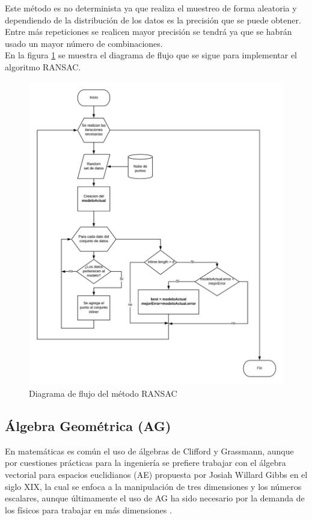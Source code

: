 Este método es no determinista ya que realiza el muestreo de forma aleatoria y dependiendo de la distribución de los datos es la precisión que se puede obtener. Entre más repeticiones se realicen mayor precisión se tendrá ya que se habrán usado un mayor número de combinaciones.\\

En la figura \ref{fig:RANSAC} se muestra el diagrama de flujo que se sigue para implementar el \gls{algoritmo} RANSAC.\\

\begin{figure}[!htb]
	\centering
	\includegraphics[width=1\textwidth]{01Introduccion/imagenes/RANSAC.jpeg}
	\caption{Diagrama de flujo del método RANSAC}
	\label{fig:RANSAC}
\end{figure}

\subsection{Álgebra Geométrica (AG)}

En matemáticas es común el uso de álgebras de Clifford y Grassmann, aunque por cuestiones prácticas para la ingeniería se prefiere trabajar con el álgebra vectorial para espacios euclidianos (AE) propuesta por Josiah Willard Gibbs en el siglo XIX, la cual se enfoca a la manipulación de tres dimensiones y los números escalares,  aunque últimamente el uso de AG ha sido necesario por la demanda de los físicos para trabajar en más dimensiones \cite{FoundOfAGC}.\\

